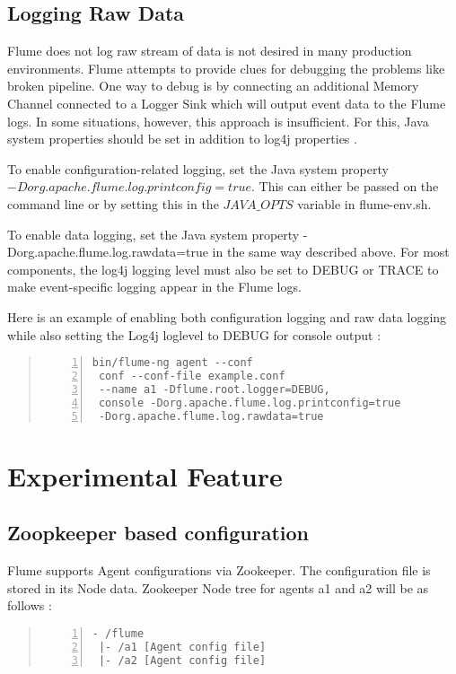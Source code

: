 \documentclass[9pt,twocolumn,twoside]{styles/osajnl}
\begin{document}
\subsection{Logging Raw Data}
Flume does not log raw stream of data is not desired in many production environments. Flume attempts to provide clues for debugging the problems like broken pipeline. One way to debug is by connecting an additional Memory Channel connected to a Logger Sink which will output event data to the Flume logs. In some situations, however, this approach is insufficient. For this, Java system properties should be set in addition to log4j properties \cite{user-manual}.

To enable configuration-related logging, set the Java system property $-Dorg.apache.flume.log.printconfig=true$. This can either be passed on the command line or by setting this in the $JAVA\_OPTS$ variable in flume-env.sh.

To enable data logging, set the Java system property -Dorg.apache.flume.log.rawdata=true in the same way described above. For most components, the log4j logging level must also be set to DEBUG or TRACE to make event-specific logging appear in the Flume logs.

Here is an example of enabling both configuration logging and raw data logging while also setting the Log4j loglevel to DEBUG for console output \cite{user-manual}:
\begin{quote}
\begin{Verbatim}[numbers=left]
 bin/flume-ng agent --conf 
 conf --conf-file example.conf 
 --name a1 -Dflume.root.logger=DEBUG,
 console -Dorg.apache.flume.log.printconfig=true 
 -Dorg.apache.flume.log.rawdata=true
\end{Verbatim}
\end{quote}
\section{Experimental Feature}
\subsection{Zoopkeeper based configuration}
Flume supports Agent configurations via Zookeeper. The configuration file is stored in its Node data.  Zookeeper Node tree for agents a1 and a2 will be as follows \cite{user-manual}:
\begin{quote}
\begin{Verbatim}[numbers=left]
- /flume
 |- /a1 [Agent config file]
 |- /a2 [Agent config file]
\end{Verbatim}
\end{quote}
\end{document}
